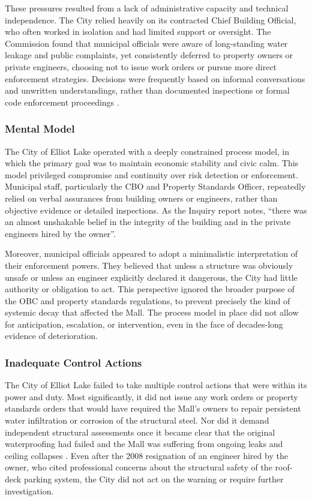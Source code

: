 \documentclass[12pt]{article}
\begin{document}
These pressures resulted from a lack of administrative capacity and technical independence. The City relied heavily on its contracted Chief Building Official, who often worked in isolation and had limited support or oversight. The Commission found that municipal officials were aware of long-standing water leakage and public complaints, yet consistently deferred to property owners or private engineers, choosing not to issue work orders or pursue more direct enforcement strategies. Decisions were frequently based on informal conversations and unwritten understandings, rather than documented inspections or formal code enforcement proceedings \cite[p378-380]{AlgoLakeReport1}.

\subsubsection*{Mental Model}

The City of Elliot Lake operated with a deeply constrained process model, in which the primary goal was to maintain economic stability and civic calm. This model privileged compromise and continuity over risk detection or enforcement. Municipal staff, particularly the CBO and Property Standards Officer, repeatedly relied on verbal assurances from building owners or engineers, rather than objective evidence or detailed inspections. As the Inquiry report notes, ``there was an almost unshakable belief in the integrity of the building and in the private engineers hired by the owner''.

Moreover, municipal officials appeared to adopt a minimalistic interpretation of their enforcement powers. They believed that unless a structure was obviously unsafe or unless an engineer explicitly declared it dangerous, the City had little authority or obligation to act. This perspective ignored the broader purpose of the OBC and property standards regulations, to prevent precisely the kind of systemic decay that affected the Mall. The process model in place did not allow for anticipation, escalation, or intervention, even in the face of decades-long evidence of deterioration.

\subsubsection*{Inadequate Control Actions}

The City of Elliot Lake failed to take multiple control actions that were within its power and duty. Most significantly, it did not issue any work orders or property standards orders that would have required the Mall's owners to repair persistent water infiltration or corrosion of the structural steel. Nor did it demand independent structural assessments once it became clear that the original waterproofing had failed and the Mall was suffering from ongoing leaks and ceiling collapses \cite[p380-385]{AlgoLakeReport1}. Even after the 2008 resignation of an engineer hired by the owner, who cited professional concerns about the structural safety of the roof-deck parking system, the City did not act on the warning or require further investigation.
\end{document}
